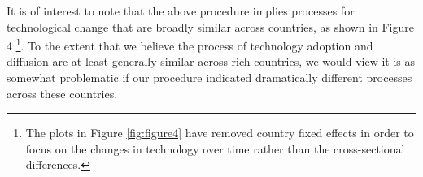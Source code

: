 \documentclass[10pt]{article}
\begin{document}
It is of interest to note that the above procedure implies processes for
technological change that are broadly similar across countries, as shown in
Figure 4 \footnote{%
The plots in Figure \ref{fig:figure4} have removed country fixed effects in order to focus
on the changes in technology over time rather than the cross-sectional
differences.}. To the extent that we believe the process of technology
adoption and diffusion are at least generally similar across rich countries,
we would view it is as somewhat problematic if our procedure indicated
dramatically different processes across these countries.



\newpage


\end{document}
